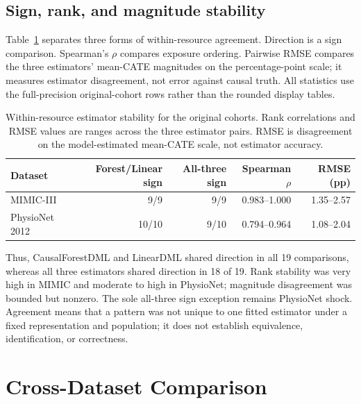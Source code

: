 \subsection{Sign, rank, and magnitude stability}
\label{subsec:results:estimator-stability-synthesis}

Table~\ref{tab:results-estimator-stability} separates three forms of within-resource agreement.  Direction is a sign comparison.  Spearman's $\rho$ compares exposure ordering.  Pairwise RMSE compares the three estimators' mean-CATE magnitudes on the percentage-point scale; it measures estimator disagreement, not error against causal truth.  All statistics use the full-precision original-cohort rows rather than the rounded display tables.

\begin{table}[htbp]
\centering
\caption[Within-resource original-cohort estimator stability.]{Within-resource estimator stability for the original cohorts.  Rank correlations and RMSE values are ranges across the three estimator pairs.  RMSE is disagreement on the model-estimated mean-CATE scale, not estimator accuracy.}
\label{tab:results-estimator-stability}
\small
\setlength{\tabcolsep}{5pt}
\begin{tabular}{@{}lrrrr@{}}
\toprule
Dataset & Forest/Linear sign & All-three sign & Spearman $\rho$ & RMSE (pp) \\
\midrule
MIMIC-III & 9/9 & 9/9 & 0.983--1.000 & 1.35--2.57 \\
PhysioNet 2012 & 10/10 & 9/10 & 0.794--0.964 & 1.08--2.04 \\
\bottomrule
\end{tabular}
\end{table}

Thus, CausalForestDML and LinearDML shared direction in all 19 comparisons, whereas all three estimators shared direction in 18 of 19.  Rank stability was very high in MIMIC and moderate to high in PhysioNet; magnitude disagreement was bounded but nonzero.  The sole all-three sign exception remains PhysioNet shock.  Agreement means that a pattern was not unique to one fitted estimator under a fixed representation and population; it does not establish equivalence, identification, or correctness.

\section{Cross-Dataset Comparison}
\label{sec:results:cross-dataset-comparison}

